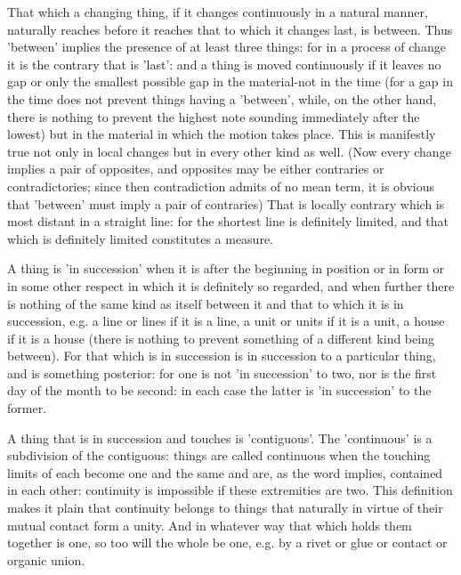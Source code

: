 That which a changing thing, if it changes continuously in a natural
manner, naturally reaches before it reaches that to which it changes
last, is between. Thus 'between' implies the presence of at least
three things: for in a process of change it is the contrary that is
'last': and a thing is moved continuously if it leaves no gap or only
the smallest possible gap in the material-not in the time (for a gap
in the time does not prevent things having a 'between', while, on
the other hand, there is nothing to prevent the highest note sounding
immediately after the lowest) but in the material in which the motion
takes place. This is manifestly true not only in local changes but
in every other kind as well. (Now every change implies a pair of opposites,
and opposites may be either contraries or contradictories; since then
contradiction admits of no mean term, it is obvious that 'between'
must imply a pair of contraries) That is locally contrary which is
most distant in a straight line: for the shortest line is definitely
limited, and that which is definitely limited constitutes a measure.

A thing is 'in succession' when it is after the beginning in position
or in form or in some other respect in which it is definitely so regarded,
and when further there is nothing of the same kind as itself between
it and that to which it is in succession, e.g. a line or lines if
it is a line, a unit or units if it is a unit, a house if it is a
house (there is nothing to prevent something of a different kind being
between). For that which is in succession is in succession to a particular
thing, and is something posterior: for one is not 'in succession'
to two, nor is the first day of the month to be second: in each case
the latter is 'in succession' to the former. 

A thing that is in succession and touches is 'contiguous'. The 'continuous'
is a subdivision of the contiguous: things are called continuous when
the touching limits of each become one and the same and are, as the
word implies, contained in each other: continuity is impossible if
these extremities are two. This definition makes it plain that continuity
belongs to things that naturally in virtue of their mutual contact
form a unity. And in whatever way that which holds them together is
one, so too will the whole be one, e.g. by a rivet or glue or contact
or organic union. 

